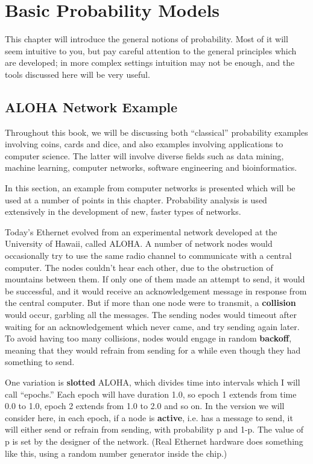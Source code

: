 \chapter{Basic Probability Models}
\label{probcalc}

This chapter will introduce the general notions of probability.  Most of
it will seem intuitive to you, but pay careful attention to the general
principles which are developed; in more complex settings intuition may
not be enough, and the tools discussed here will be very useful.

\section{ALOHA Network Example}
\label{aloha}

Throughout this book, we will be discussing both ``classical''
probability examples involving coins, cards and dice, and also examples
involving applications to computer science.  The latter will involve
diverse fields such as data mining, machine learning, computer networks,
software engineering and bioinformatics.  

In this section, an example from computer networks is presented which
will be used at a number of points in this chapter.  Probability analysis
is used extensively in the development of new, faster types of networks.

Today's Ethernet evolved from an experimental network developed at the
University of Hawaii, called ALOHA.  A number of network nodes would
occasionally try to use the same radio channel to communicate with a
central computer.  The nodes couldn't hear each other, due to the
obstruction of mountains between them.  If only one of them made an
attempt to send, it would be successful, and it would receive an
acknowledgement message in response from the central computer.  But if
more than one node were to transmit, a {\bf collision} would occur,
garbling all the messages.  The sending nodes would timeout after
waiting for an acknowledgement which never came, and try sending again
later.  To avoid having too many collisions, nodes would engage in
random {\bf backoff}, meaning that they would refrain from sending for a
while even though they had something to send.

One variation is {\bf slotted} ALOHA, which divides time into intervals
which I will call ``epochs.''  Each epoch will have duration 1.0, so
epoch 1 extends from time 0.0 to 1.0, epoch 2 extends from 1.0 to 2.0
and so on.  In the version we will consider here, in each epoch, if a
node is {\bf active}, i.e. has a message to send, it will either send or
refrain from sending, with probability p and 1-p.  The value of p is set
by the designer of the network.  (Real Ethernet hardware does something
like this, using a random number generator inside the chip.) 

